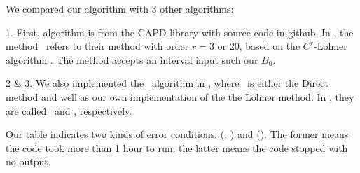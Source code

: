 	We compared our algorithm with 3 other algorithms:
	
	1. First, algorithm is from
	the CAPD library \cite{capd-homepage} with source code in github.
	In , the method \capdCr\ refers to their method
	 with order $r=3$ or $20$,
	based on the $C^r$-Lohner algorithm
	\cite{zgliczynski:lohner:02,capd:rigorousDynSys:21}.
	The method accepts an interval input such our $B_0$.
	
	2 \& 3. We also implemented the \simpleIVP\ algorithm 
	in , where \stepB\ is either the 
	Direct method  and
	well as our own implementation of the
	the Lohner method. In , they are called 
	\simpleIVPdirect\ and \simpleIVPlohner, respectively.  
	
	Our table indicates two kinds of error conditions:
	 (\simpleIVPdirect, \simpleIVPlohner)
	and  (\capdCr).
	The former means the code took more than 1 hour to run.
	the latter means the code stopped with no output.
	



